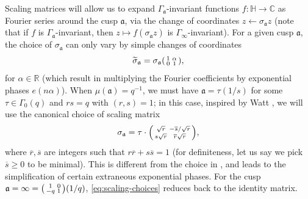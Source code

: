 \documentclass[reqno,11pt]{amsart}
\theoremstyle{remark}
\numberwithin{equation}{section}
\newcommand{\R}{\mathbb{R}}
\newcommand{\C}{\mathbb{C}}
\renewcommand{\H}{\mathbb{H}}
\newcommand{\ma}{\mathfrak{a}}
\newcommand{\Id}{\textnormal{Id}}
\renewcommand{\bar}{\overline}
\renewcommand{\tilde}{\widetilde}
\newenvironment{psmall}
  {\left(\begin{smallmatrix}}
  {\end{smallmatrix}\right)}
\begin{document}
Scaling matrices will allow us to expand $\Gamma_{\ma}$-invariant functions $f : \H \to \C$ as Fourier series around the cusp $\ma$, via the change of coordinates $z \gets \sigma_\ma z$ (note that if $f$ is $\Gamma_{\ma}$-invariant, then $z \mapsto f(\sigma_{\ma} z)$ is $\Gamma_\infty$-invariant). For a given cusp $\ma$, the choice of $\sigma_{\ma}$ can only vary by simple changes of coordinates 
\begin{equation} \label{eq:vary-scaling}
    \tilde{\sigma}_{\ma} = \sigma_{\ma} \begin{psmall} 1 & \alpha \\ 0 & 1 \end{psmall},
\end{equation}
for $\alpha \in \R$ (which result in multiplying the Fourier coefficients by exponential phases $e(n\alpha)$). When $\mu(\ma) = q^{-1}$, we must have $\ma = \tau (1/s)$ for some $\tau \in \Gamma_0(q)$ and $rs = q$ with $(r, s) = 1$; in this case, inspired by Watt \cite[p.\,195]{watt1995kloosterman}, we will use the canonical choice of scaling matrix
\begin{equation} \label{eq:scaling-choices}
    \sigma_{\ma} = \tau \cdot \begin{psmall} 
    \sqrt{r} & -\bar{s}/\sqrt{r} \\
    s\sqrt{r} & \bar{r}\sqrt{r}
    \end{psmall},
\end{equation}
where $\bar{r}, \bar{s}$ are integers such that $r\bar{r} + s\bar{s} = 1$ (for definiteness, let us say we pick $\bar{s} \ge 0$ to be minimal). This is different from the choice in \cite[(2.3)]{deshouillers1982kloosterman}, and leads to the simplification of certain extraneous exponential phases. For the cusp $\ma = \infty = \begin{psmall} 1 & 0 \\ -q & 1 \end{psmall} (1/q)$, \cref{eq:scaling-choices} reduces back to the identity matrix.
\end{document}
